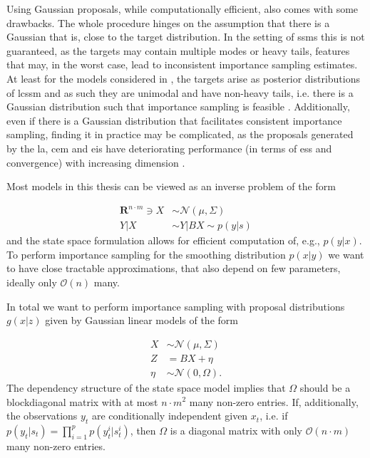 Using Gaussian proposals, while computationally efficient, also comes with some drawbacks. The whole procedure hinges on the assumption that there is a Gaussian that is, close to the target distribution. In the setting of \glspl{ssm} this is not guaranteed, as the targets may contain multiple modes or heavy tails, features that may, in the worst case, lead to inconsistent importance sampling estimates. At least for the models considered in , the targets arise as posterior distributions of \gls{lcssm} and as such they are unimodal and have non-heavy tails, i.e. there is a Gaussian distribution such that importance sampling is feasible . 
Additionally, even if there is a Gaussian distribution that facilitates consistent importance sampling, finding it in practice may be complicated, as the proposals generated by the \gls{la}, \gls{cem} and \gls{eis} have deteriorating performance (in terms of \gls{ess} and convergence) with increasing dimension .



Most models in this thesis can be viewed as an inverse problem of the form

\begin{align*}
    \mathbf{R}^{n\cdot m} \ni X & \sim \mathcal N(\mu, \Sigma) \\
    Y|X                         & \sim Y|BX \sim p(y|s)
\end{align*}
and the state space formulation allows for efficient computation of, e.g., $p(y|x)$.
To perform importance sampling for the smoothing distribution $p(x|y)$ we want to have close tractable approximations, that also depend on few parameters, ideally only $\mathcal O(n)$ many.


In total we want to perform importance sampling with proposal distributions $g(x|z)$ given by Gaussian linear models of the form

\begin{align*}
    X    & \sim \mathcal N(\mu, \Sigma) \\
    Z    & = BX + \eta                  \\
    \eta & \sim \mathcal N(0, \Omega).
\end{align*}
The dependency structure of the state space model implies that $\Omega$ should be a blockdiagonal matrix with at most $n \cdot m^{2}$ many non-zero entries.
If, additionally, the observations $y_{t}$ are conditionally independent given $x_{t}$, i.e. if $p(y_{t}|s_{t}) = \prod_{i = 1}^{p} p(y_{t}^{i}|s_{t}^i)$, then $\Omega$ is a diagonal matrix with only $\mathcal O(n \cdot m)$ many non-zero entries.

